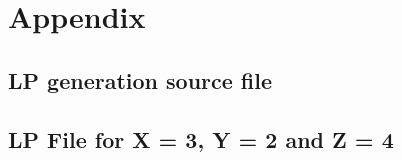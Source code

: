 \documentclass[12pt,twoside]{article}
\begin{document}
\lstset{style=mystyle}

\newpage

\section{Appendix}
\subsection{LP generation source file}

\newpage
\subsection{LP File for X = 3, Y = 2 and Z = 4}

\end{document}
